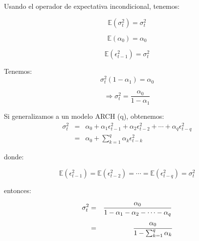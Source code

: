 	
	
	Usando el operador de expectativa incondicional, tenemos:
	
	\[
	\mathbb{E}\left(\sigma_{t}^{2}\right)=\sigma_{t}^{2}
	\]
	
	
	\[
	\mathbb{E}\left(\alpha_{0}\right)=\alpha_{0}
	\]
	
	
	\[
	\mathbb{E}\left(\epsilon_{t-1}^{2}\right)=\sigma_{t}^{2}
	\]
	
	
	\medskip{}
	
	
	Tenemos:\\
	\begin{equation}
	\sigma_{t}^{2}\left(1-\alpha_{1}\right)=\alpha_{0}
	\end{equation}
	
	
	\begin{equation}
	\Rightarrow\sigma_{t}^{2}=\frac{\alpha_{0}}{1-\alpha_{1}}
	\end{equation}
	
	
	\medskip{}
	

	
	
	Si generalizamos a un modelo ARCH (q), obtenemos:\\
	\begin{eqnarray}
	\sigma_{t}^{2} & = & \alpha_{0}+\alpha_{1}\epsilon_{t-1}^{2}+\alpha_{2}\epsilon_{t-2}^{2}+\cdots+\alpha_{q}\epsilon_{t-q}^{2}\nonumber \\
	& = & \alpha_{0}+\sum_{k=1}^{q}\alpha_{k}\epsilon_{t-k}^{2}
	\end{eqnarray}
	
	
	donde:
	
	\[
	\mathbb{E}\left(\epsilon_{t-1}^{2}\right)=\mathbb{E}\left(\epsilon_{t-2}^{2}\right)=\cdots=\mathbb{E}\left(\epsilon_{t-q}^{2}\right)=\sigma_{t}^{2}
	\]
	
	
	entonces:
	
	\begin{eqnarray}
	\sigma_{t}^{2} & = & \frac{\alpha_{0}}{1-\alpha_{1}-\alpha_{2}-\cdots-\alpha_{q}}\nonumber \\
	& = & \cfrac{\alpha_{0}}{1-\sum_{k=1}^{q}\alpha_{k}}
	\end{eqnarray}
	
